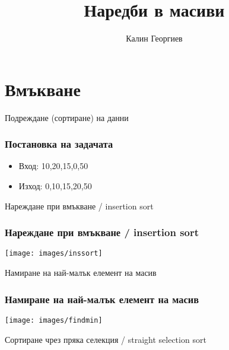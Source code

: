 \documentclass{beamer}
\begin{document}
\title[Увод в програмирането]{Наредби в масиви} 
\author{Калин Георгиев} 
\frame{\titlepage} 


\section{Вмъкване} 


\begin{frame}
\centerline{Подреждане (сортиране) на данни}
\end{frame}


\begin{frame}[fragile]
\frametitle{Постановка на задачата}
\begin{itemize}
  \item Вход: 10,20,15,0,50
  \item Изход: 0,10,15,20,50
\end{itemize}
\end{frame}


\begin{frame}
\centerline{Нареждане при вмъкване / insertion sort}
\end{frame}



\begin{frame}[fragile]
\frametitle{Нареждане при вмъкване / insertion sort}

\texttt{[image: images/inssort]} 

\end{frame}


\begin{frame}
\centerline{Намиране на най-малък елемент на масив}
\end{frame}



\begin{frame}[fragile]
\frametitle{Намиране на най-малък елемент на масив}

\hspace*{-40pt}
\texttt{[image: images/findmin]} 

\end{frame}


\begin{frame}
\centerline{Сортиране чрез пряка селекция / straight selection sort}
\end{frame}
\end{document}
